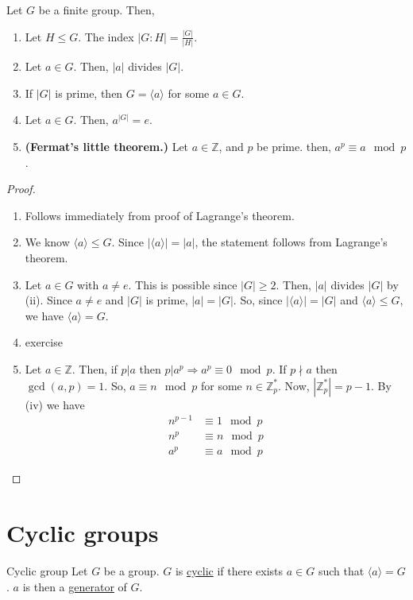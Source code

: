 \documentclass[12pt]{article}
\newcommand{\Z}{\mathbb{Z}}
\begin{document}
	\begin{mycor}{}{}
		Let $G$ be a finite group. Then,
		\begin{enumerate}[label=(\roman*)]
			\item Let $H\leq G$. The index $|G:H|=\frac{|G|}{|H|}$.
			\item Let $a\in G$. Then, $|a|$ divides $|G|$.
			\item If $|G|$ is prime, then $G=\langle a\rangle$ for some $a\in G$.
			\item Let $a\in G$. Then, $a^{|G|}=e$.
			\item  \textbf{(Fermat's little theorem.)} Let $a\in\Z$, and $p$ be prime. then, $a^p\equiv a\mod p$.
		\end{enumerate}
		\begin{proof}~
			\begin{enumerate}[label=(\roman*)]
				\item Follows immediately from proof of Lagrange's theorem.
				\item We know $\langle a\rangle\leq G$. Since $|\langle a\rangle|=|a|$, the statement follows from Lagrange's theorem.
				\item Let $a\in G$ with $a\neq e$. This is possible since $|G|\geq2$. Then, $|a|$ divides $|G|$ by (ii). Since $a\neq e$ and $|G|$ is prime, $|a|=|G|$. So, since $|\langle a\rangle|=|G|$ and $\langle a\rangle\leq G$, we have $\langle a\rangle=G$.
				\item exercise
				\item Let $a\in\Z$. Then, if $p|a$ then $p|a^p\Longrightarrow a^p\equiv0\mod p$. If $p\nmid a$ then $\gcd(a, p)=1$. So, $a\equiv n\mod p$ for some $n\in\Z_p^*$. Now, $|\Z_p^*|=p-1$. By (iv) we have
				\begin{align*}
					n^{p-1}&\equiv1\mod p\\
					n^p&\equiv n\mod p\\
					a^p&\equiv a\mod p
				\end{align*}
			\end{enumerate}
		\end{proof}
	\end{mycor}
	
	\section{Cyclic groups}
	\begin{mydef}{Cyclic group}{}
		Let $G$ be a group. $G$ is \underline{cyclic} if there exists $a\in G$ such that $\langle a\rangle=G$. $a$ is then a \underline{generator} of $G$.
	\end{mydef}
	
\end{document}
